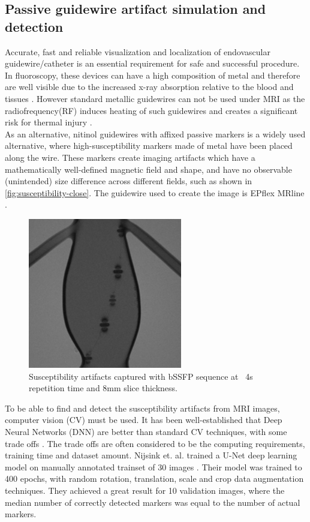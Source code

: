 \documentclass{article}
\begin{document}
\subsection{Passive guidewire artifact simulation and detection}
Accurate, fast and reliable visualization and localization of endovascular guidewire/catheter is an essential requirement for safe and successful procedure. In fluoroscopy, these devices can have a high composition of metal and therefore are well visible due to the increased x-ray absorption relative to the blood and tissues \cite{active-vs-passive-tracking}. However standard metallic guidewires can not be used under MRI as the radiofrequency(RF) induces heating of such guidewires and creates a significant risk for thermal injury \cite{sus-artifact-metallic-marker-heat}.
\\ As an alternative, nitinol guidewires with affixed passive markers is a widely used alternative, where high-susceptibility markers made of metal have been placed along the wire. These markers create imaging artifacts which have a mathematically well-defined magnetic field and shape, and have no observable (unintended) size difference across different fields, such as shown in \autoref{fig:susceptibility-close}. The guidewire used to create the image is EPflex MRline \cite{epflex-mrline-guidewire}.

\begin{figure}[h]
    \centering
    \includegraphics[width=0.6\textwidth]{img/artifact-close.png}
    \caption{Susceptibility artifacts captured with bSSFP sequence at ~4s repetition time and 8mm slice thickness.}
    \label{fig:susceptibility-close}
\end{figure}

To be able to find and detect the susceptibility artifacts from MRI images, computer vision (CV) must be used. It has been well-established that Deep Neural Networks (DNN) are better than standard CV techniques, with some trade offs \cite{computer-vision-cnn-vs-cv}. The trade offs are often considered to be the computing requirements, training time and dataset amount. Nijsink et. al. trained a U-Net deep learning model on manually annotated trainset of 30 images \cite{passive-marker-visibility-and-detection}. Their model was trained to 400 epochs, with random rotation, translation, scale and crop data augmentation techniques. They achieved a great result for 10 validation images, where the median number of correctly detected markers was equal to the number of actual markers.
\end{document}
